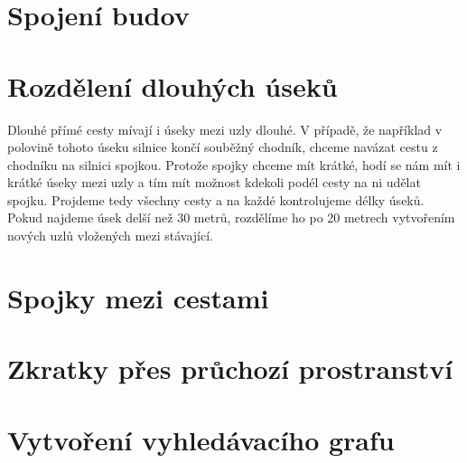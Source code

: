 \section{Spojení budov}

\section{Rozdělení dlouhých úseků}
Dlouhé přímé cesty mívají i úseky mezi uzly dlouhé. V případě, že například v
polovině tohoto úseku silnice končí souběžný chodník, chceme navázat cestu z
chodníku na silnici spojkou. Protože spojky chceme mít krátké, hodí se nám mít i
krátké úseky mezi uzly a tím mít možnost kdekoli podél cesty na ni udělat
spojku. Projdeme tedy všechny cesty a na každé kontrolujeme délky úseků. Pokud
najdeme úsek delší než 30 metrů, rozdělíme ho po 20 metrech vytvořením nových
uzlů vložených mezi stávající.

\section{Spojky mezi cestami}
\section{Zkratky přes průchozí prostranství}
\section{Vytvoření vyhledávacího grafu}
